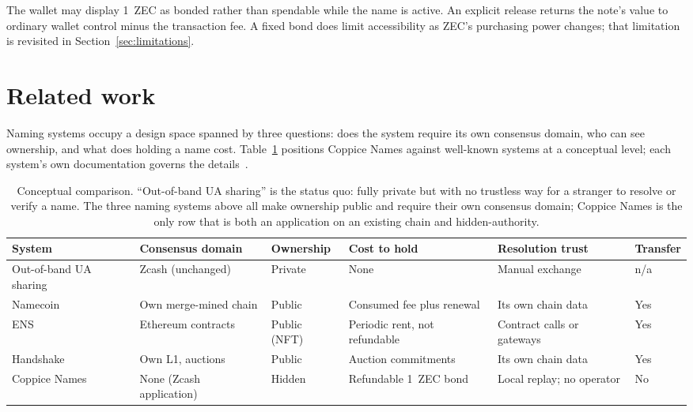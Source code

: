 \documentclass[11pt]{article}
\begin{document}
The wallet may display 1~ZEC as bonded rather than spendable while the name
is active. An explicit release returns the note's value to ordinary wallet
control minus the transaction fee. A fixed bond does limit accessibility as
ZEC's purchasing power changes; that limitation is revisited in
Section~\ref{sec:limitations}.

\section{Related work}
\label{sec:related}

Naming systems occupy a design space spanned by three questions: does the
system require its own consensus domain, who can see ownership, and what does
holding a name cost. Table~\ref{tab:related} positions Coppice Names against
well-known systems at a conceptual level; each system's own documentation
governs the details~\cite{namecoin,ens,handshake}.

\begin{table}[ht]
\centering
\footnotesize
\setlength{\tabcolsep}{4pt}
\begin{tabular}{>{\raggedright\arraybackslash}p{}>{\raggedright\arraybackslash}p{}>{\raggedright\arraybackslash}p{}>{\raggedright\arraybackslash}p{}>{\raggedright\arraybackslash}p{}l}
\toprule
System & Consensus domain & Ownership & Cost to hold & Resolution trust & Transfer \\
\midrule
Out-of-band UA sharing & Zcash (unchanged) & Private & None & Manual exchange & n/a \\
Namecoin & Own merge-mined chain & Public & Consumed fee plus renewal & Its own chain data & Yes \\
ENS & Ethereum contracts & Public (NFT) & Periodic rent, not refundable & Contract calls or gateways & Yes \\
Handshake & Own L1, auctions & Public & Auction commitments & Its own chain data & Yes \\
Coppice Names & None (Zcash application) & Hidden & Refundable 1~ZEC bond & Local replay; no operator & No \\
\bottomrule
\end{tabular}
\caption{Conceptual comparison. ``Out-of-band UA sharing'' is the status quo:
fully private but with no trustless way for a stranger to resolve or verify a
name. The three naming systems above all make ownership public and require
their own consensus domain; Coppice Names is the only row that is both an
application on an existing chain and hidden-authority.}
\label{tab:related}
\end{table}
\end{document}
